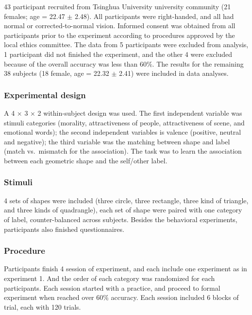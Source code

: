 \documentclass[
  english,
  man]{apa6}
\begin{document}
43 participant recruited from Tsinghua University university community (21 females; age = 22.47 \(\pm\) 2.48). All participants were right-handed, and all had normal or corrected-to-normal vision. Informed consent was obtained from all participants prior to the experiment according to procedures approved by the local ethics committee. The data from 5 participants were excluded from analysis, 1 participant did not finished the experiment, and the other 4 were excluded because of the overall accuracy was less than 60\%. The results for the remaining 38 subjects (18 female, age = 22.32 \(\pm\) 2.41) were included in data analyses.

\hypertarget{experimental-design-2}{%
\subsubsection{Experimental design}\label{experimental-design-2}}

A 4 × 3 × 2 within-subject design was used. The first independent variable was stimuli categories (morality, attractiveness of people, attractiveness of scene, and emotional words); the second independent variables is valence (positive, neutral and negative); the third variable was the matching between shape and label (match vs.~mismatch for the association). The task was to learn the association between each geometric shape and the self/other label.

\hypertarget{stimuli-3}{%
\subsubsection{Stimuli}\label{stimuli-3}}

4 sets of shapes were included (three circle, three rectangle, three kind of triangle, and three kinds of quadrangle), each set of shape were paired with one category of label, counter-balanced across subjects. Besides the behavioral experiments, participants also finished questionnaires.

\hypertarget{procedure-8}{%
\subsubsection{Procedure}\label{procedure-8}}

Participants finish 4 session of experiment, and each include one experiment as in experiment 1. And the order of each category was randomized for each participants. Each session started with a practice, and proceed to formal experiment when reached over 60\% accuracy. Each session included 6 blocks of trial, each with 120 trials.
\end{document}
